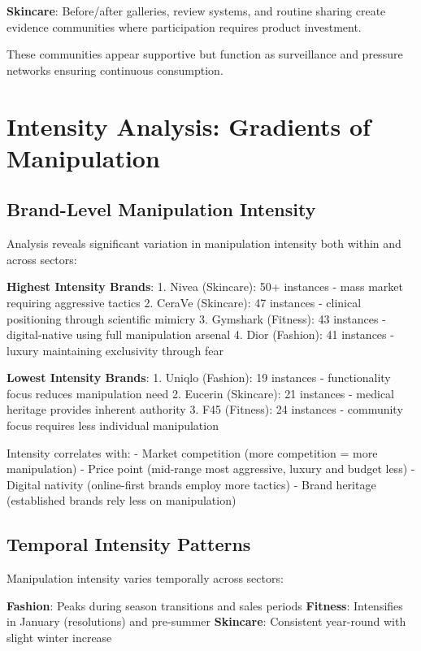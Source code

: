\textbf{Skincare}: Before/after galleries, review systems, and routine sharing create evidence communities where participation requires product investment.

These communities appear supportive but function as surveillance and pressure networks ensuring continuous consumption.

\section{Intensity Analysis: Gradients of Manipulation}
\label{sec:intensity}

\subsection{Brand-Level Manipulation Intensity}

Analysis reveals significant variation in manipulation intensity both within and across sectors:

\textbf{Highest Intensity Brands}:
1. Nivea (Skincare): 50+ instances - mass market requiring aggressive tactics
2. CeraVe (Skincare): 47 instances - clinical positioning through scientific mimicry
3. Gymshark (Fitness): 43 instances - digital-native using full manipulation arsenal
4. Dior (Fashion): 41 instances - luxury maintaining exclusivity through fear

\textbf{Lowest Intensity Brands}:
1. Uniqlo (Fashion): 19 instances - functionality focus reduces manipulation need
2. Eucerin (Skincare): 21 instances - medical heritage provides inherent authority
3. F45 (Fitness): 24 instances - community focus requires less individual manipulation

Intensity correlates with:
- Market competition (more competition = more manipulation)
- Price point (mid-range most aggressive, luxury and budget less)
- Digital nativity (online-first brands employ more tactics)
- Brand heritage (established brands rely less on manipulation)

\subsection{Temporal Intensity Patterns}

Manipulation intensity varies temporally across sectors:

\textbf{Fashion}: Peaks during season transitions and sales periods
\textbf{Fitness}: Intensifies in January (resolutions) and pre-summer
\textbf{Skincare}: Consistent year-round with slight winter increase

